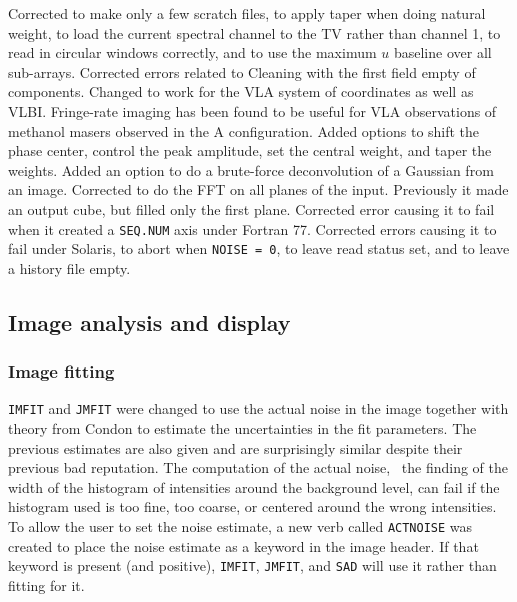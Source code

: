 \begin{description}
 Corrected to make only a few scratch files, to apply
    taper when doing natural weight, to load the current spectral
    channel to the TV rather than channel 1, to read in circular
    windows correctly, and to use the maximum $u$ baseline over all
    sub-arrays.
 Corrected errors related to Cleaning with the first
    field empty of components.
 Changed to work for the VLA system of coordinates as
    well as \hbox{VLBI}.  Fringe-rate imaging has been found to be
    useful for VLA observations of methanol masers observed in the A
    configuration.
 Added options to shift the phase center, control the
    peak amplitude, set the central weight, and taper the weights.
 Added an option to do a brute-force deconvolution of a
    Gaussian from an image.
 Corrected to do the FFT on all planes of the input.
    Previously it made an output cube, but filled only the first
    plane.
 Corrected error causing it to fail when it created a
    {\tt SEQ.NUM} axis under Fortran 77.
 Corrected errors causing it to fail under Solaris, to
    abort when {\tt NOISE = 0}, to leave read status set, and to leave
    a history file empty.
\end{description}

\subsection{Image analysis and display}

\subsubsection{Image fitting}

     {\tt IMFIT} and {\tt JMFIT} were changed to use the actual noise
in the image together with theory from Condon to estimate the
uncertainties in the fit parameters.  The previous estimates are also
given and are surprisingly similar despite their previous bad
reputation.  The computation of the actual noise, \ie\ the finding of
the width of the histogram of intensities around the background level,
can fail if the histogram used is too fine, too coarse, or centered
around the wrong intensities.  To allow the user to set the noise
estimate, a new verb called {\tt ACTNOISE} was created to place the
noise estimate as a keyword in the image header.  If that keyword is
present (and positive), {\tt IMFIT}, {\tt JMFIT}, and {\tt SAD} will
use it rather than fitting for it.


